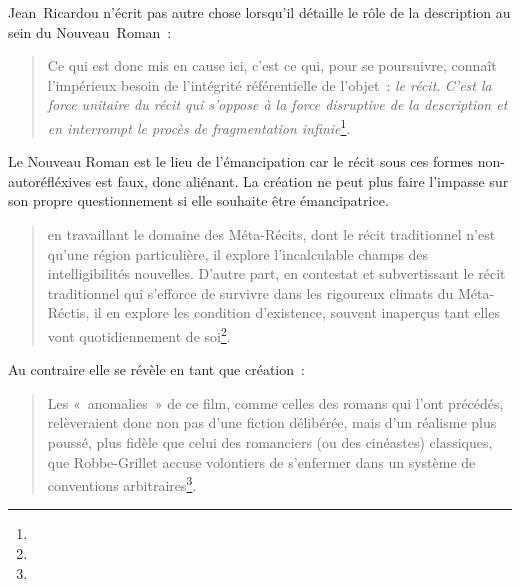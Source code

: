 \documentclass[12pt, a4paper]{article}
\begin{document}
Jean~Ricardou n'écrit pas autre chose lorsqu'il détaille le rôle de la description au sein du Nouveau~Roman~:
\begin{quote}
    Ce qui est donc mis en cause ici, c'est ce qui, pour se poursuivre, connaît l'impérieux besoin de l'intégrité référentielle de l'objet~: \textit{le récit}. \textit{C'est la force unitaire du récit qui s'oppose à la force disruptive de la description et en interrompt le procès de fragmentation infinie}\footnote{}.
\end{quote}
Le Nouveau Roman est le lieu de l'émancipation car le récit sous ces formes non-autoréfléxives est faux, donc aliénant. La création ne peut plus faire l'impasse sur son propre questionnement si elle souhaite être émancipatrice.
\begin{quote}
    en travaillant le domaine des Méta-Récits, dont le récit traditionnel n'est qu'une région particulière,  il explore l'incalculable champs des intelligibilités nouvelles. D'autre part, en contestat et subvertissant le récit traditionnel qui s'efforce de survivre dans les rigoureux climats du Méta-Réctis, il en explore les condition d'existence, souvent inaperçus tant elles vont quotidiennement de soi\footnote{}.
\end{quote}
Au contraire elle se révèle en tant que création~:
\begin{quote}
    Les «~anomalies~» de ce film, comme celles des romans qui l'ont précédés, relèveraient donc non pas d'une fiction délibérée, mais d'un réalisme plus poussé, plus fidèle que celui des romanciers (ou des cinéastes) classiques, que Robbe-Grillet accuse volontiers de s'enfermer dans un système de conventions arbitraires\footnote{}.
\end{quote}
\end{document}
